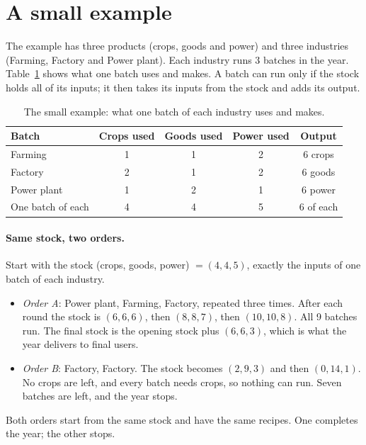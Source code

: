 \documentclass[11pt]{article}
\begin{document}
\section{A small example}\label{sec:example}

The example has three products (crops, goods and power) and three industries (Farming, Factory and Power plant). Each industry runs 3 batches in the year. Table~\ref{tab:recipes} shows what one batch uses and makes. A batch can run only if the stock holds all of its inputs; it then takes its inputs from the stock and adds its output.

\begin{table}[htbp]
\centering\small
\caption{The small example: what one batch of each industry uses and makes.}
\label{tab:recipes}
\begin{tabular}{@{}lcccc@{}}
\toprule
Batch & Crops used & Goods used & Power used & Output\\
\midrule
Farming & 1 & 1 & 2 & 6 crops\\
Factory & 2 & 1 & 2 & 6 goods\\
Power plant & 1 & 2 & 1 & 6 power\\
\midrule
One batch of each & 4 & 4 & 5 & 6 of each\\
\bottomrule
\end{tabular}
\end{table}

\paragraph{Same stock, two orders.} Start with the stock (crops, goods, power) $=(4,4,5)$, exactly the inputs of one batch of each industry.
\begin{itemize}[leftmargin=*]
\item \emph{Order A}: Power plant, Farming, Factory, repeated three times. After each round the stock is $(6,6,6)$, then $(8,8,7)$, then $(10,10,8)$. All 9 batches run. The final stock is the opening stock plus $(6,6,3)$, which is what the year delivers to final users.
\item \emph{Order B}: Factory, Factory. The stock becomes $(2,9,3)$ and then $(0,14,1)$. No crops are left, and every batch needs crops, so nothing can run. Seven batches are left, and the year stops.
\end{itemize}
Both orders start from the same stock and have the same recipes. One completes the year; the other stops.
\end{document}
